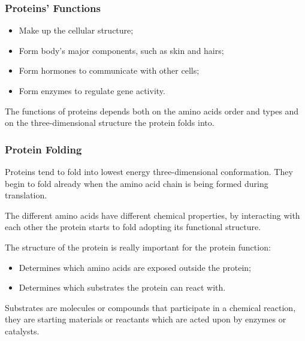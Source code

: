 \subsubsection{Proteins' Functions}
\begin{itemize}
	\item Make up the cellular structure;
	\item Form body's major components, such as skin and hairs;
	\item Form hormones to communicate with other cells;
	\item Form enzymes to regulate gene activity.
\end{itemize}

The functions of proteins depends both on the amino acids order and types and on the three-dimensional structure the protein folds into.

\subsubsection{Protein Folding}
Proteins tend to fold into lowest energy three-dimensional conformation. They begin to fold already when the amino acid chain is being formed during translation.

The different amino acids have different chemical properties, by interacting with each other the protein starts to fold adopting its functional structure.

The structure of the protein is really important for the protein function:
\begin{itemize}
	\item Determines which amino acids are exposed outside the protein;
	\item Determines which substrates the protein can react with.
\end{itemize}

Substrates are molecules or compounds that participate in a chemical reaction, they are starting materials or reactants which are acted upon by enzymes or catalysts.
\vspace{6em}
\pagebreak

